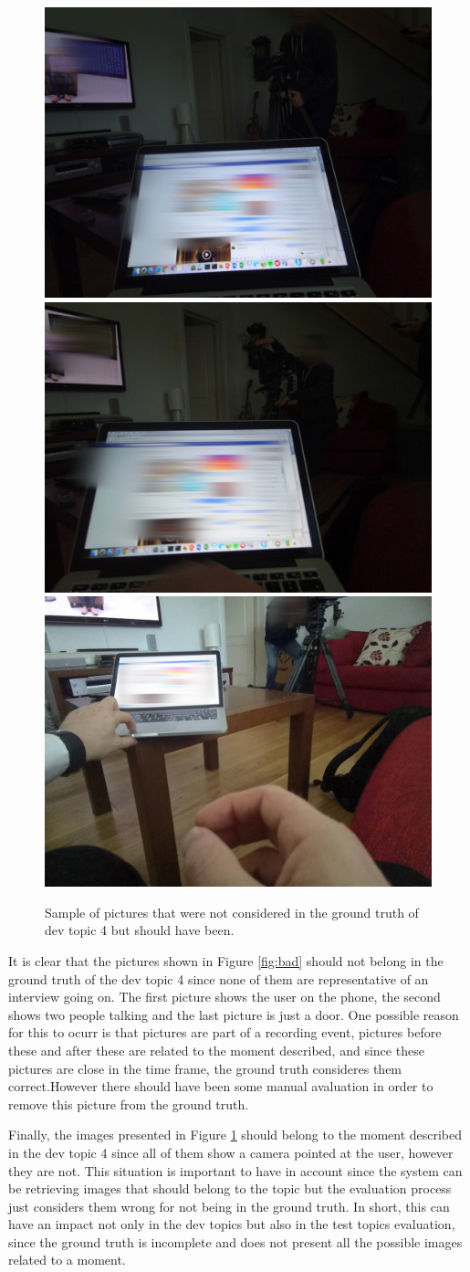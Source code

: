     \begin{figure}[H]
        \centering
        \captionsetup{justification=centering}
        \includegraphics[width=.32\linewidth]{Sections/5ImageClef/images/1_ngt.jpg}
        \includegraphics[width=.32\linewidth]{Sections/5ImageClef/images/2_ngt.jpg}
        \includegraphics[width=.32\linewidth]{Sections/5ImageClef/images/3_ngt.jpg}
        \caption[Pictures that should belong in the ground truth]{Sample of pictures that were not considered in the ground truth of dev topic 4 but should have been.}
        \label{fig:good}
        \end{figure}
     
    It is clear that the pictures shown in Figure \ref{fig:bad} should not belong in the ground truth of the dev topic 4 since none of them are representative of an interview going on. The first picture shows the user on the phone, the second shows two people talking and the last picture is just a door. One possible reason for this to ocurr is that pictures are part of a recording event, pictures before these and after these are related to the moment described, and since these pictures are close in the time frame, the ground truth consideres them correct.However there should have been some manual avaluation in order to remove this picture from the ground truth.
    
    Finally, the images presented in Figure \ref{fig:good} should belong to the moment described in the dev topic 4 since all of them show a camera pointed at the user, however they are not.  This situation is important to have in account since the system can be retrieving images that should belong to the topic but the evaluation process just considers them wrong for not being in the ground truth. In short, this can have an impact not only in the dev topics but also in the test topics evaluation, since the ground truth is incomplete and does not present all the possible images related to a moment.
